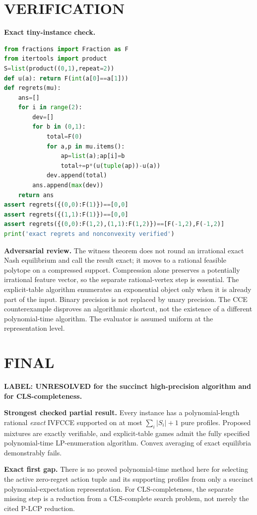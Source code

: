 \documentclass[11pt,a4paper]{article}
\theoremstyle{definition}\newtheorem{definition}[theorem]{Definition}
\theoremstyle{remark}\newtheorem{remark}[theorem]{Remark}
\newcommand{\1}{\mathbf 1}
\begin{document}
\section{VERIFICATION}
\textbf{Exact tiny-instance check.}
\begin{lstlisting}[language=Python]
from fractions import Fraction as F
from itertools import product
S=list(product((0,1),repeat=2))
def u(a): return F(int(a[0]==a[1]))
def regrets(mu):
    ans=[]
    for i in range(2):
        dev=[]
        for b in (0,1):
            total=F(0)
            for a,p in mu.items():
                ap=list(a);ap[i]=b
                total+=p*(u(tuple(ap))-u(a))
            dev.append(total)
        ans.append(max(dev))
    return ans
assert regrets({(0,0):F(1)})==[0,0]
assert regrets({(1,1):F(1)})==[0,0]
assert regrets({(0,0):F(1,2),(1,1):F(1,2)})==[F(-1,2),F(-1,2)]
print('exact regrets and nonconvexity verified')
\end{lstlisting}

\textbf{Adversarial review.} The witness theorem does not round an irrational exact Nash equilibrium and call the result exact; it moves to a rational feasible polytope on a compressed support. Compression alone preserves a potentially irrational feature vector, so the separate rational-vertex step is essential. The explicit-table algorithm enumerates an exponential object only when it is already part of the input. Binary precision is not replaced by unary precision. The CCE counterexample disproves an algorithmic shortcut, not the existence of a different polynomial-time algorithm. The evaluator is assumed uniform at the representation level.

\section{FINAL}
\textbf{LABEL: UNRESOLVED for the succinct high-precision algorithm and for CLS-completeness.}

\textbf{Strongest checked partial result.} Every instance has a polynomial-length rational \emph{exact} IVFCCE supported on at most $\sum_i|S_i|+1$ pure profiles. Proposed mixtures are exactly verifiable, and explicit-table games admit the fully specified polynomial-time LP-enumeration algorithm. Convex averaging of exact equilibria demonstrably fails.

\textbf{Exact first gap.} There is no proved polynomial-time method here for selecting the active zero-regret action tuple and its supporting profiles from only a succinct polynomial-expectation representation. For CLS-completeness, the separate missing step is a reduction from a CLS-complete search problem, not merely the cited P-LCP reduction.
\end{document}
